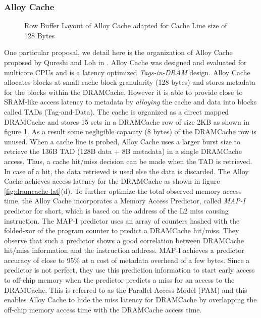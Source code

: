 \subsubsection{Alloy Cache} \label{alloy-background}
\begin{figure}[!htb]
	\centering
	\def\svgwidth{\columnwidth}
	
	\caption{Row Buffer Layout of Alloy Cache adapted for Cache Line size of 128 Bytes}
	\label{fig:dramcache-rb}
\end{figure}
\par One particular proposal, we detail here is the organization of Alloy Cache proposed by Qureshi and Loh in \cite{alloy}. Alloy Cache was designed and evaluated for multicore CPUs and is a latency optimized \textit{Tags-in-DRAM} design. Alloy Cache allocates blocks at small cache block granularity (128 bytes) and stores metadata for the blocks within the DRAMCache. However it is able to provide close to SRAM-like access latency to metadata by \textit{alloying} the cache and data into blocks called TADs (Tag-and-Data). The cache is organized as a direct mapped DRAMCache and stores 15 sets in a DRAMCache row of size 2KB as shown in figure \ref{fig:dramcache-rb}. As a result some negligible capacity (8 bytes) of the DRAMCache row is unused. When a cache line is probed, Alloy Cache uses a larger burst size to retrieve the 136B TAD (128B data + 8B metadata) in a single DRAMCache access. Thus, a cache hit/miss decision can be made when the TAD is retrieved. In case of a hit, the data retrieved is used else the data is discarded. The Alloy Cache achieves access latency for the DRAMCache as shown in figure \ref{fig:dramcache-lat}(d). To further optimize the total observed memory access time, the Alloy Cache incorporates a Memory Access Predictor, called \textit{MAP-I} predictor for short, which is based on the address of the L2 miss causing instruction. The MAP-I predictor uses an array of counters hashed with the folded-xor of the program counter to predict a DRAMCache hit/miss. They observe that such a predictor shows a good correlation between DRAMCache hit/miss information and the instruction address. MAP-I achieves a predictor accuracy of close to 95\% at a cost of metadata overhead of a few bytes. Since a predictor is not perfect, they use this prediction information to start early access to off-chip memory when the predictor predicts a miss for an access to the DRAMCache. This is referred to as the Parallel-Access-Model (PAM) and this enables Alloy Cache to hide the miss latency for DRAMCache by overlapping the off-chip memory access time with the DRAMCache access time.

